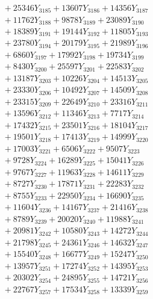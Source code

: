 \documentclass[a4paper,10pt]{article}
\begin{document}
{\begin{align}
&\;  + 25346 Y_{3185} + 13607 Y_{3186} + 14356 Y_{3187} \\[0.3ex]
&\;  + 11762 Y_{3188} + 9878 Y_{3189} + 23089 Y_{3190} \\[0.3ex]
&\;  + 18389 Y_{3191} + 19144 Y_{3192} + 11805 Y_{3193} \\[0.3ex]
&\;  + 23780 Y_{3194} + 20179 Y_{3195} + 21989 Y_{3196} \\[0.3ex]
&\;  + 6860 Y_{3197} + 17992 Y_{3198} + 19734 Y_{3199} \\[0.3ex]
&\;  + 8430 Y_{3200} + 25597 Y_{3201} + 22583 Y_{3202} \\[0.3ex]
&\;  + 13187 Y_{3203} + 10226 Y_{3204} + 14513 Y_{3205} \\[0.3ex]
&\;  + 23330 Y_{3206} + 10492 Y_{3207} + 14509 Y_{3208} \\[0.5ex]\allowbreak
&\;  + 23315 Y_{3209} + 22649 Y_{3210} + 23316 Y_{3211} \\[0.3ex]
&\;  + 13596 Y_{3212} + 11346 Y_{3213} + 7717 Y_{3214} \\[0.3ex]
&\;  + 17432 Y_{3215} + 23501 Y_{3216} + 18104 Y_{3217} \\[0.3ex]
&\;  + 19501 Y_{3218} + 17413 Y_{3219} + 14999 Y_{3220} \\[0.3ex]
&\;  + 17003 Y_{3221} + 6506 Y_{3222} + 9507 Y_{3223} \\[0.3ex]
&\;  + 9728 Y_{3224} + 16289 Y_{3225} + 15041 Y_{3226} \\[0.3ex]
&\;  + 9767 Y_{3227} + 11963 Y_{3228} + 14611 Y_{3229} \\[0.3ex]
&\;  + 8727 Y_{3230} + 17871 Y_{3231} + 22283 Y_{3232} \\[0.3ex]
&\;  + 8755 Y_{3233} + 22950 Y_{3234} + 16690 Y_{3235} \\[0.3ex]
&\;  + 11604 Y_{3236} + 14167 Y_{3237} + 21416 Y_{3238} \\[0.5ex]\allowbreak
&\;  + 8789 Y_{3239} + 20020 Y_{3240} + 11988 Y_{3241} \\[0.3ex]
&\;  + 20981 Y_{3242} + 10580 Y_{3243} + 14272 Y_{3244} \\[0.3ex]
&\;  + 21798 Y_{3245} + 24361 Y_{3246} + 14632 Y_{3247} \\[0.3ex]
&\;  + 15540 Y_{3248} + 16677 Y_{3249} + 15247 Y_{3250} \\[0.3ex]
&\;  + 13957 Y_{3251} + 17274 Y_{3252} + 14395 Y_{3253} \\[0.3ex]
&\;  + 20302 Y_{3254} + 24895 Y_{3255} + 14721 Y_{3256} \\[0.3ex]
&\;  + 22767 Y_{3257} + 17534 Y_{3258} + 13339 Y_{3259} \\[0.3ex]

\end{align}}
\end{document}
